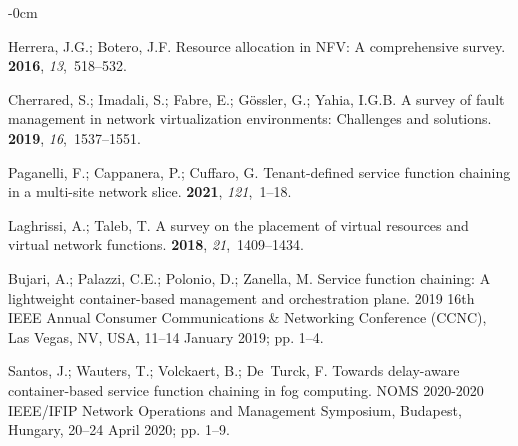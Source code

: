 \documentclass[futureinternet,review,accept,pdftex,moreauthors]{Definitions/mdpi}
\begin{document}
\begin{adjustwidth}{-\extralength}{0cm}


\begin{thebibliography}{999}

Herrera, J.G.; Botero, J.F.
\newblock Resource allocation in NFV: A comprehensive survey.
 {\bf 2016},
  {\em 13},~518--532.

Cherrared, S.; Imadali, S.; Fabre, E.; G{\"o}ssler, G.; Yahia, I.G.B.
\newblock A survey of fault management in network virtualization environments:
  Challenges and solutions.
 {\bf 2019},
  {\em 16},~1537--1551.

Paganelli, F.; Cappanera, P.; Cuffaro, G.
\newblock Tenant-defined service function chaining in a multi-site network
  slice.
 {\bf 2021}, {\em
  121},~1--18.

Laghrissi, A.; Taleb, T.
\newblock A survey on the placement of virtual resources and virtual network
  functions.
 {\bf 2018}, {\em
  21},~1409--1434.

Bujari, A.; Palazzi, C.E.; Polonio, D.; Zanella, M.
\newblock Service function chaining: A lightweight container-based management
  and orchestration plane.
2019 16th IEEE Annual Consumer Communications \& Networking
  Conference (CCNC),  Las Vegas, NV, USA, 11--14 January 2019; pp. 1--4.

Santos, J.; Wauters, T.; Volckaert, B.; De~Turck, F.
\newblock Towards delay-aware container-based service function chaining in fog
  computing.
 NOMS 2020-2020 IEEE/IFIP Network Operations and Management  %
  Symposium,  Budapest, Hungary, 20--24 April 2020; pp. 1--9.


\end{thebibliography}
\end{adjustwidth}
\end{document}
